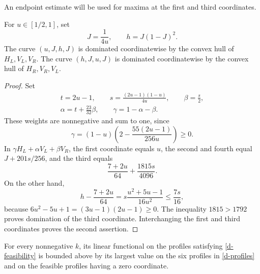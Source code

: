 An endpoint estimate will be used for maxima at the first and third
coordinates.

\begin{lemma}\label{d-endpoint-curves}
For $u\in[1/2,1]$, set
\begin{equation}\label{d-Jh}
J=\frac1{4u},\qquad h=J(1-J)^2.
\end{equation}
The curve $(u,J,h,J)$ is dominated coordinatewise by the convex hull of
$H_L,V_L,V_R$. The curve $(h,J,u,J)$ is dominated coordinatewise by the
convex hull of $H_R,V_R,V_L$.
\end{lemma}

\begin{proof}
Set
\begin{equation}\label{d-curve-weights}
\begin{gathered}
t=2u-1,\qquad s=\frac{(2u-1)(1-u)}{4u},\qquad \beta=\frac s2,\\
\alpha=t+\frac{23}{32}\beta,\qquad \gamma=1-\alpha-\beta.
\end{gathered}
\end{equation}
These weights are nonnegative and sum to one, since
\[
\gamma=(1-u)\left(2-\frac{55(2u-1)}{256u}\right)\geq0.
\]
In $\gamma H_L+\alpha V_L+\beta V_R$, the first coordinate equals $u$,
the second and fourth equal $J+201s/256$, and the third equals
\[
\frac{7+2u}{64}+\frac{1815s}{4096}.
\]
On the other hand,
\begin{equation}\label{d-curve-remainder}
h-\frac{7+2u}{64}
=s\frac{u^2+5u-1}{16u^2}\leq\frac{7s}{16},
\end{equation}
because $6u^2-5u+1=(3u-1)(2u-1)\geq0$. The inequality $1815>1792$
proves domination of the third coordinate. Interchanging the first and
third coordinates proves the second assertion.
\end{proof}

\begin{lemma}\label{d-reduction}
For every nonnegative $k$, its linear functional on the profiles satisfying
\eqref{d-feasibility} is bounded above by its largest value on the six
profiles in \eqref{d-profiles} and on the feasible profiles having a zero
coordinate.
\end{lemma}

